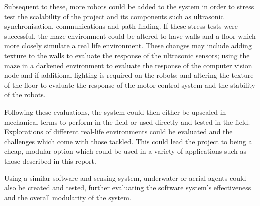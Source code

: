 Subsequent to these, more robots could be added to the system in order to 
stress test the scalability of the 
project and its components such as ultrasonic synchronisation, 
communications and path-finding. If these stress tests were successful, 
the maze environment could be altered to have walls and a floor which more 
closely simulate a real life environment. These changes may include adding 
texture to the walls to evaluate the response of the ultrasonic sensors; 
using the maze in a darkened environment to evaluate the response of the 
computer vision node and if additional lighting is required on the robots; 
and altering the texture of the floor to evaluate the response of the motor 
control system and the stability of the robots. 

Following these evaluations, the system could then either be upscaled in 
mechanical terms to perform in the field or used directly and tested in the 
field. Explorations of different real-life environments could be evaluated 
and the challenges which come with those tackled. This could lead the 
project to being a cheap, modular option which could be used in a variety of 
applications such as those described in this report. 

Using a similar software and sensing system, underwater or aerial agents 
could also be created and tested, further evaluating the software system's 
effectiveness and the overall modularity of the system. 